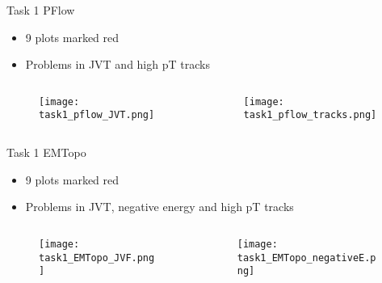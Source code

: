 

\begin{frame}{Task 1 PFlow}
\vspace{-0.3cm}
\begin{itemize}
\item 9 plots marked red
\item Problems in JVT and high pT tracks
\end{itemize}
\begin{columns}
\begin{column}{0.5\textwidth}

\begin{figure}
\centering
\texttt{[image: task1\_pflow\_JVT.png]}
\end{figure}

\end{column}
\begin{column}{0.5\textwidth}

\begin{figure}
\centering
\texttt{[image: task1\_pflow\_tracks.png]}
\end{figure}

\end{column}
\end{columns}
\end{frame}



\begin{frame}{Task 1 EMTopo}
\vspace{-0.3cm}
\begin{itemize}
\item 9 plots marked red
\item Problems in JVT, negative energy and high pT tracks
\end{itemize}
\begin{columns}
\begin{column}{0.5\textwidth}

\begin{figure}
\centering
\texttt{[image: task1\_EMTopo\_JVF.png]}
\end{figure}

\end{column}
\begin{column}{0.5\textwidth}

\begin{figure}
\centering
\texttt{[image: task1\_EMTopo\_negativeE.png]}
\end{figure}

\end{column}
\end{columns}
\end{frame}


